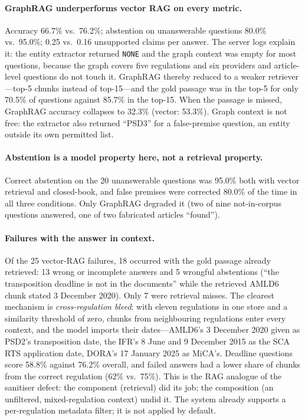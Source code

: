 \documentclass[10pt,twocolumn]{article}
\begin{document}
\paragraph{GraphRAG underperforms vector RAG on every metric.}
Accuracy 66.7\% vs.\ 76.2\%; abstention on unanswerable questions 80.0\% vs.\ 95.0\%; 0.25 vs.\ 0.16 unsupported claims per answer. The server logs explain it: the entity extractor returned \texttt{NONE} and the graph context was empty for most questions, because the graph covers five regulations and six providers and article-level questions do not touch it. GraphRAG thereby reduced to a weaker retriever---top-5 chunks instead of top-15---and the gold passage was in the top-5 for only 70.5\% of questions against 85.7\% in the top-15. When the passage is missed, GraphRAG accuracy collapses to 32.3\% (vector: 53.3\%). Graph context is not free: the extractor also returned ``PSD3'' for a false-premise question, an entity outside its own permitted list.

\paragraph{Abstention is a model property here, not a retrieval property.}
Correct abstention on the 20 unanswerable questions was 95.0\% both with vector retrieval and closed-book, and false premises were corrected 80.0\% of the time in all three conditions. Only GraphRAG degraded it (two of nine not-in-corpus questions answered, one of two fabricated articles ``found'').

\paragraph{Failures with the answer in context.}
Of the 25 vector-RAG failures, 18 occurred with the gold passage already retrieved: 13 wrong or incomplete answers and 5 wrongful abstentions (``the transposition deadline is not in the documents'' while the retrieved AMLD6 chunk stated 3 December 2020). Only 7 were retrieval misses. The clearest mechanism is \emph{cross-regulation bleed}: with eleven regulations in one store and a similarity threshold of zero, chunks from neighbouring regulations enter every context, and the model imports their dates---AMLD6's 3 December 2020 given as PSD2's transposition date, the IFR's 8 June and 9 December 2015 as the SCA RTS application date, DORA's 17 January 2025 as MiCA's. Deadline questions score 58.8\% against 76.2\% overall, and failed answers had a lower share of chunks from the correct regulation (62\% vs.\ 75\%). This is the RAG analogue of the sanitiser defect: the component (retrieval) did its job; the composition (an unfiltered, mixed-regulation context) undid it. The system already supports a per-regulation metadata filter; it is not applied by default.
\end{document}
